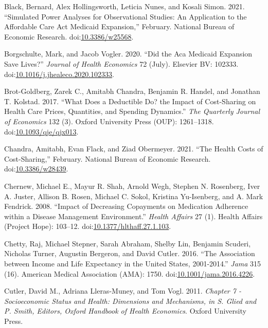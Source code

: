 \documentclass[a4paper,12pt]{article}
\begin{document}
\hypertarget{citeproc_bib_item_3}{Black, Bernard, Alex Hollingsworth, Leticia Nunes, and Kosali Simon. 2021. “Simulated Power Analyses for Observational Studies: An Application to the Affordable Care Act Medicaid Expansion,” February. National Bureau of Economic Research. doi:\href{https://doi.org/10.3386/w25568}{10.3386/w25568}.}

\hypertarget{citeproc_bib_item_4}{Borgschulte, Mark, and Jacob Vogler. 2020. “Did the Aca Medicaid Expansion Save Lives?” \textit{Journal of Health Economics} 72 (July). Elsevier BV: 102333. doi:\href{https://doi.org/10.1016/j.jhealeco.2020.102333}{10.1016/j.jhealeco.2020.102333}.}

\hypertarget{citeproc_bib_item_5}{Brot-Goldberg, Zarek C., Amitabh Chandra, Benjamin R. Handel, and Jonathan T. Kolstad. 2017. “What Does a Deductible Do? the Impact of Cost-Sharing on Health Care Prices, Quantities, and Spending Dynamics.” \textit{The Quarterly Journal of Economics} 132 (3). Oxford University Press (OUP): 1261–1318. doi:\href{https://doi.org/10.1093/qje/qjx013}{10.1093/qje/qjx013}.}

\hypertarget{citeproc_bib_item_6}{Chandra, Amitabh, Evan Flack, and Ziad Obermeyer. 2021. “The Health Costs of Cost-Sharing,” February. National Bureau of Economic Research. doi:\href{https://doi.org/10.3386/w28439}{10.3386/w28439}.}

\hypertarget{citeproc_bib_item_7}{Chernew, Michael E., Mayur R. Shah, Arnold Wegh, Stephen N. Rosenberg, Iver A. Juster, Allison B. Rosen, Michael C. Sokol, Kristina Yu-Isenberg, and A. Mark Fendrick. 2008. “Impact of Decreasing Copayments on Medication Adherence within a Disease Management Environment.” \textit{Health Affairs} 27 (1). Health Affairs (Project Hope): 103–12. doi:\href{https://doi.org/10.1377/hlthaff.27.1.103}{10.1377/hlthaff.27.1.103}.}

\hypertarget{citeproc_bib_item_8}{Chetty, Raj, Michael Stepner, Sarah Abraham, Shelby Lin, Benjamin Scuderi, Nicholas Turner, Augustin Bergeron, and David Cutler. 2016. “The Association between Income and Life Expectancy in the United States, 2001-2014.” \textit{Jama} 315 (16). American Medical Association (AMA): 1750. doi:\href{https://doi.org/10.1001/jama.2016.4226}{10.1001/jama.2016.4226}.}

\hypertarget{citeproc_bib_item_9}{Cutler, David M., Adriana Lleras-Muney, and Tom Vogl. 2011. \textit{Chapter 7 - Socioeconomic Status and Health: Dimensions and Mechanisms, in S. Glied and P. Smith, Editors, Oxford Handbook of Health Economics}. Oxford University Press.}
\end{document}
